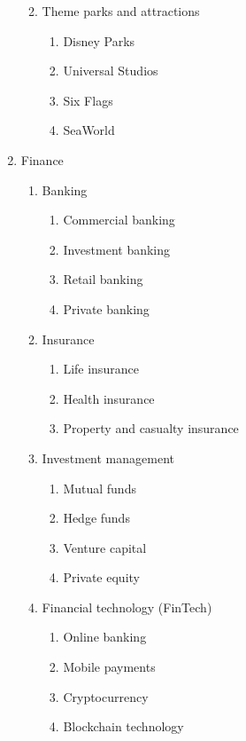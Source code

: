 \begin{enumerate}
\begin{enumerate}
\begin{enumerate}
        \end{enumerate}
        \item Theme parks and attractions
        \begin{enumerate}
            \item Disney Parks
            \item Universal Studios
            \item Six Flags
            \item SeaWorld
        \end{enumerate}
    \end{enumerate}
    \item Finance
    \begin{enumerate}
        \item Banking
        \begin{enumerate}
            \item Commercial banking
            \item Investment banking
            \item Retail banking
            \item Private banking
        \end{enumerate}
        \item Insurance
        \begin{enumerate}
            \item Life insurance
            \item Health insurance
            \item Property and casualty insurance
        \end{enumerate}
        \item Investment management
        \begin{enumerate}
            \item Mutual funds
            \item Hedge funds
            \item Venture capital
            \item Private equity
        \end{enumerate}
        \item Financial technology (FinTech)
        \begin{enumerate}
            \item Online banking
            \item Mobile payments
            \item Cryptocurrency
            \item Blockchain technology

\end{enumerate}
\end{enumerate}
\end{enumerate}
